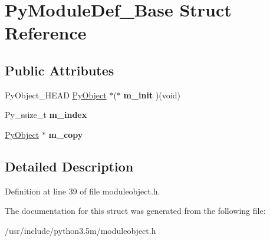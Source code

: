\hypertarget{structPyModuleDef__Base}{}\section{Py\+Module\+Def\+\_\+\+Base Struct Reference}
\label{structPyModuleDef__Base}
\subsection*{Public Attributes}
\begin{DoxyCompactItemize}
\item 
Py\+Object\+\_\+\+H\+E\+AD \hyperlink{struct__object}{Py\+Object} $\ast$($\ast$ {\bfseries m\+\_\+init} )(void)\hypertarget{structPyModuleDef__Base_a8bda667d2cad0ef158a62dd353b7111b}{}\label{structPyModuleDef__Base_a8bda667d2cad0ef158a62dd353b7111b}

\item 
Py\+\_\+ssize\+\_\+t {\bfseries m\+\_\+index}\hypertarget{structPyModuleDef__Base_a979e51a4af3ea436bdca4619024dabdf}{}\label{structPyModuleDef__Base_a979e51a4af3ea436bdca4619024dabdf}

\item 
\hyperlink{struct__object}{Py\+Object} $\ast$ {\bfseries m\+\_\+copy}\hypertarget{structPyModuleDef__Base_af180f7db9b28eff5b4590e3845671727}{}\label{structPyModuleDef__Base_af180f7db9b28eff5b4590e3845671727}

\end{DoxyCompactItemize}


\subsection{Detailed Description}


Definition at line 39 of file moduleobject.\+h.



The documentation for this struct was generated from the following file\+:\begin{DoxyCompactItemize}
\item 
/usr/include/python3.\+5m/moduleobject.\+h\end{DoxyCompactItemize}
